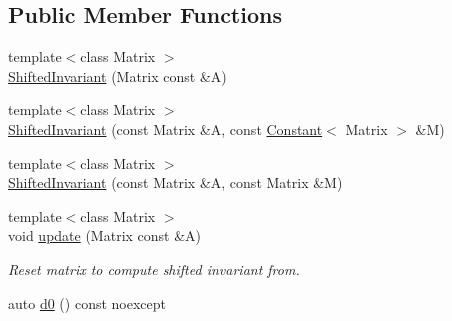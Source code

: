 \subsection*{Public Member Functions}
\begin{DoxyCompactItemize}
\item 
{\footnotesize template$<$class Matrix $>$ }\\\hyperlink{classRFFGen_1_1LinearAlgebra_1_1ShiftedInvariant_aebc264a312f0efff2ae7467d98eced75}{Shifted\-Invariant} (Matrix const \&A)
\item 
{\footnotesize template$<$class Matrix $>$ }\\\hyperlink{classRFFGen_1_1LinearAlgebra_1_1ShiftedInvariant_a52e0e4abd5099d9aa5b4ee1c73589adc}{Shifted\-Invariant} (const Matrix \&A, const \hyperlink{structRFFGen_1_1Constant}{Constant}$<$ Matrix $>$ \&M)
\item 
{\footnotesize template$<$class Matrix $>$ }\\\hyperlink{classRFFGen_1_1LinearAlgebra_1_1ShiftedInvariant_a2b15177fa88cd62ffec101d22ecea76e}{Shifted\-Invariant} (const Matrix \&A, const Matrix \&M)
\item 
\hypertarget{classRFFGen_1_1LinearAlgebra_1_1ShiftedInvariant_a89785734ed595d7e0c7e95562ef45400}{{\footnotesize template$<$class Matrix $>$ }\\void \hyperlink{classRFFGen_1_1LinearAlgebra_1_1ShiftedInvariant_a89785734ed595d7e0c7e95562ef45400}{update} (Matrix const \&A)}\label{classRFFGen_1_1LinearAlgebra_1_1ShiftedInvariant_a89785734ed595d7e0c7e95562ef45400}

\begin{DoxyCompactList}\small\item\em Reset matrix to compute shifted invariant from. \end{DoxyCompactList}\item 
\hypertarget{classRFFGen_1_1LinearAlgebra_1_1ShiftedInvariant_a4acc15ad6257a5871a5bf4da97efdbd8}{auto \hyperlink{classRFFGen_1_1LinearAlgebra_1_1ShiftedInvariant_a4acc15ad6257a5871a5bf4da97efdbd8}{d0} () const noexcept}\label{classRFFGen_1_1LinearAlgebra_1_1ShiftedInvariant_a4acc15ad6257a5871a5bf4da97efdbd8}


\end{DoxyCompactItemize}
